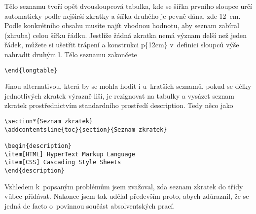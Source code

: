 \documentclass[FF,fonts]{tulthesis}
\newcommand{\argument}[1]{{\ttfamily\color{\tulcolor}#1}}
\newenvironment{myquote}{\begin{list}{}{\setlength\leftmargin\parindent}\item[]}{\end{list}}
\newenvironment{listing}{\begin{myquote}\color{\tulcolor}}{\end{myquote}}
\begin{document}
Tělo seznamu tvoří opět dvousloupcová tabulka, kde se šířka prvního sloupce
určí automaticky podle nejširší zkratky a šířka druhého je pevně dána, zde
12~cm. Podle konkrétního obsahu musíte najít vhodnou hodnotu, aby seznam
zabíral (zhruba) celou šířku řádku. Jestliže žádná zkratka nemá význam delší
než jeden řádek, můžete si ušetřit trápení a konstrukci \argument{p\{12cm\}}
v~definici sloupců výše nahradit druhým \argument{l}. Tělo seznamu zakončete

\begin{listing}
\begin{verbatim}
\end{longtable}
\end{verbatim}
\end{listing}

Jinou alternativou, která by se mohla hodit i u~kratších seznamů, pokud se
délky jednotlivých zkratek výrazně liší, je rezignovat na tabulky a vysázet
seznam zkratek prostřednictvím standardního prostředí \argument{description}.
Tedy něco jako

\begin{listing}
\begin{verbatim}
\section*{Seznam zkratek}
\addcontentsline{toc}{section}{Seznam zkratek}

\begin{description}
\item[HTML] HyperText Markup Language
\item[CSS] Cascading Style Sheets
\end{description}
\end{verbatim}
\end{listing}

Vzhledem k~popsaným problémům jsem zvažoval, zda seznam zkratek do třídy vůbec
přidávat. Nakonec jsem tak udělal především proto, abych zdůraznil, že se jedná
de facto o~povinnou součást absolventských prací.


\renewcommand{\indexname}{Přehled příkazů, prostředí a voleb}
\printindex
\end{document}
